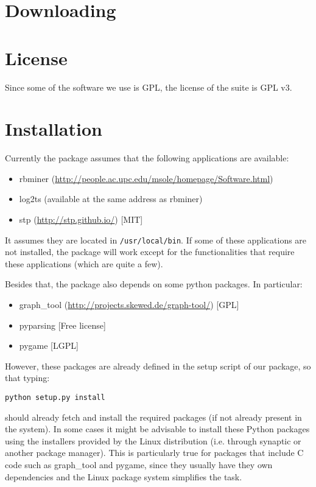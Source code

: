 \documentclass[a4paper,10pt]{book}
\begin{document}
\section{Downloading}

\section{License}
Since some of the software we use is GPL, the license of the suite is GPL v3.

\section{Installation}
Currently the package assumes that the following applications are available:
\begin{itemize}
 \item rbminer (\url{http://people.ac.upc.edu/msole/homepage/Software.html})
 \item log2ts (available at the same address as rbminer)
 \item stp (\url{http://stp.github.io/}) [MIT]
\end{itemize}
It assumes they are located in \texttt{/usr/local/bin}. If some of these applications are not installed, the package will work except for the functionalities that require these applications (which are quite a few).

Besides that, the package also depends on some python packages. In particular:
\begin{itemize}
 \item graph\_tool (\url{http://projects.skewed.de/graph-tool/}) [GPL]
 \item pyparsing [Free license]
 \item pygame [LGPL]
\end{itemize}
However, these packages are already defined in the setup script of our package, so that typing:
\begin{verbatim}
python setup.py install 
\end{verbatim}
should already fetch and install the required packages (if not already present in the system). In some cases it might be advisable to install these Python packages using the installers provided by the Linux distribution (i.e. through synaptic or another package manager). This is particularly true for packages that include C code such as graph\_tool and pygame, since they usually have they own dependencies and the Linux package system simplifies the task. 
\end{document}
